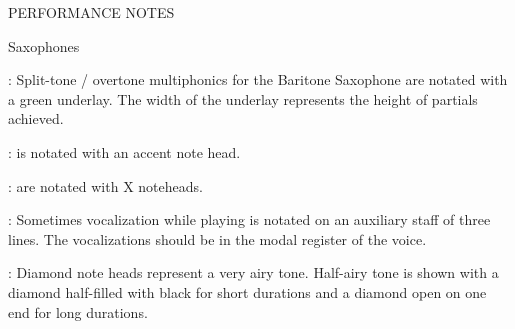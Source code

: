 \documentclass[11pt]{article}
\newcommand*\circled[1]{\tikz[baseline=(char.base)]{
            \node[shape=circle,draw,inner sep=1pt] (char) {#1};}}
\begin{document}
\vspace*{1.25\baselineskip}

\begin{center}
\huge PERFORMANCE NOTES
\end{center}


\begin{center}
\huge Saxophones
\end{center}
\begingroup
\begin{center}

 : Split-tone / overtone multiphonics for the Baritone Saxophone are notated with a green underlay. The width of the underlay represents the height of partials achieved.
\rightskip\leftskip
\phantom{text} \hfill \phantom{()}

 : is notated with an accent note head.
\rightskip\leftskip
\phantom{text} \hfill \phantom{()}

 : are notated with X noteheads.
\rightskip\leftskip
\phantom{text} \hfill \phantom{()}

 : Sometimes vocalization while playing is notated on an auxiliary staff of three lines. The vocalizations should be in the modal register of the voice.
\rightskip\leftskip
\phantom{text} \hfill \phantom{()}

 : \circled{1} Diamond note heads represent a very airy tone. \circled{2} Half-airy tone is shown with a diamond half-filled with black for short durations and a diamond open on one end for long durations.
\rightskip\leftskip
\phantom{text} \hfill \phantom{()}

\end{center}
\endgroup
\end{document}
